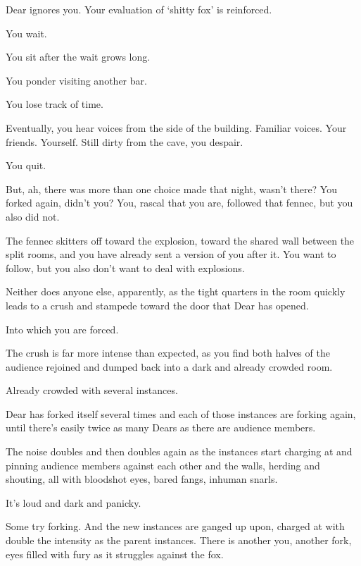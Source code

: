 Dear ignores you. Your evaluation of `shitty fox' is reinforced.

You wait.

You sit after the wait grows long.

You ponder visiting another bar.

You lose track of time.

Eventually, you hear voices from the side of the building. Familiar voices. Your friends. Yourself. Still dirty from the cave, you despair.

\vfill

\begin{flushright}
\footnotesize
You quit.
\end{flushright}

\newpage
\null
\newpage
\null

\newpage

But, ah, there was more than one choice made that night, wasn't there? You forked again, didn't you? You, rascal that you are, followed that fennec, but you also did not.

The fennec skitters off toward the explosion, toward the shared wall between the split rooms, and you have already sent a version of you after it. You want to follow, but you also don't want to deal with explosions.

Neither does anyone else, apparently, as the tight quarters in the room quickly leads to a crush and stampede toward the door that Dear has opened.

Into which you are forced.

The crush is far more intense than expected, as you find both halves of the audience rejoined and dumped back into a dark and already crowded room.

Already crowded with several instances.

Dear has forked itself several times and each of those instances are forking again, until there's easily twice as many Dears as there are audience members.

The noise doubles and then doubles again as the instances start charging at and pinning audience members against each other and the walls, herding and shouting, all with bloodshot eyes, bared fangs, inhuman snarls.

It's loud and dark and panicky.

Some try forking. And the new instances are ganged up upon, charged at with double the intensity as the parent instances. There is another you, another fork, eyes filled with fury as it struggles against the fox.

